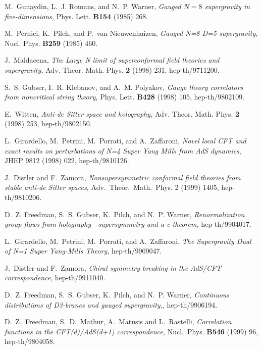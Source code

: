 \documentclass[a4paper,12pt]{article}
\begin{document}
\begin{thebibliography}{99}


 M.~Gunaydin, L.~J. Romans, and N.~P. Warner, {\em
Gauged $N=8$ supergravity in five-dimensions,} Phys. Lett.
{\bf B154} (1985) 268.

M.~Pernici, K.~Pilch, and P.~van Nieuwenhuizen, {\em Gauged N=8 D=5
  supergravity,}  Nucl. Phys. {\bf B259} (1985) 460.


J.~Maldacena, {\em The Large N limit of superconformal field theories and
  supergravity,} Adv. Theor. Math. Phys. {\bf 2} (1998) 231,
   hep-th/9711200.

 S.~S. Gubser, I.~R. Klebanov, and A.~M. Polyakov, {\em
Gauge theory correlators from noncritical string theory,}
Phys. Lett. {\bf B428} (1998) 105, hep-th/9802109.

E.~Witten, {\em Anti-de Sitter space and holography,} Adv. Theor. Math.
  Phys. {\bf 2} (1998) 253, hep-th/9802150.

 L.~Girardello, M.~Petrini, M.~Porrati, and
A.~Zaffaroni, {\em Novel local CFT and exact results on perturbations
of N=4 Super Yang Mills from AdS dynamics}, JHEP 9812 (1998) 022,
hep-th/9810126.

 J.~Distler and F.~Zamora, {\em Nonsupersymmetric
conformal field theories from stable anti-de Sitter spaces,}
Adv.~Theor.~Math.~Phys. 2 (1999) 1405, hep-th/9810206.

 D.~Z. Freedman, S.~S. Gubser, K.~Pilch, and
N.~P. Warner, {\em Renormalization group flows from
holography---supersymmetry and a c-theorem,} hep-th/9904017.

 L.~Girardello, M.~Petrini, M.~Porrati, and
A.~Zaffaroni, {\em The Supergravity Dual of N=1 Super Yang-Mills
Theory}, hep-th/9909047.


 J.~Distler and F.~Zamora, {\em Chiral symmetry breaking in
the AdS/CFT correspondence}, hep-th/9911040.



 D.~Z. Freedman, S.~S. Gubser, K.~Pilch, and
N.~P. Warner, {\em Continuous distributions of D3-branes and gauged
supergravity,}, hep-th/9906194.



 D.~Z.~Freedman, S.~D.~Mathur, A.~Matusis and
L.~Rastelli, {\em Correlation functions in the CFT(d)/AdS(d+1)
correspondence,} Nucl.~Phys. {\bf B546} (1999) 96, hep-th/9804058.


\end{thebibliography}
\end{document}
